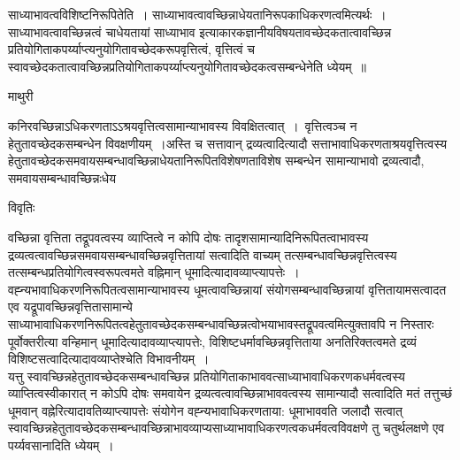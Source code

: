 \documentclass[10pt, openany]{book}
\begin{document}
{{\qt साध्याभावत्वविशिष्टनिरूपितेति~।} साध्याभावत्वावच्छिन्नाधेयतानिरूपकाधिकरणत्वमित्यर्थः~। साध्याभावत्वावच्छिन्नत्वं चाधेयतायां साध्याभाव इत्याकारकज्ञानीयविषयतावच्छेदकतात्वावच्छिन्न प्रतियोगिताकपर्य्याप्त्यनुयोगितावच्छेदकरूपवृत्तित्वं, वृत्तित्वं च स्वावच्छेदकतात्वावच्छिन्नप्रतियोगिताकपर्य्याप्त्यनुयोगितावच्छेदकत्वसम्बन्धेनेति ध्येयम्~॥
\newpage
\begin{center}  माथुरी  \end{center}
{\la कनिरवच्छिन्नाऽधिकरणताऽऽश्रयवृत्तित्वसामान्याभावस्य विवक्षितत्वात्~।~वृत्तित्वञ्च न हेतुतावच्छेदकसम्बन्धेन विवक्षणीयम्~।अस्ति च सत्तावान् द्रव्यत्वादित्यादौ सत्ताभावाधिकरणताश्रयवृत्तित्वस्य हेतुतावच्छेदकसमवायसम्बन्धावच्छिन्नाधेयतानिरूपितविशेषणताविशेष सम्बन्धेन सामान्याभावो द्रव्यत्वादौ, समवायसम्बन्धावच्छिन्नःधेय}
\begin{center}     विवृतिः \end{center}
वच्छिन्ना वृत्तिता तद्रूपवत्वस्य व्याप्तित्वे न कोपि दोषः तादृशसामान्यादिनिरूपितत्वाभावस्य द्रव्यत्वत्वावच्छिन्नसमवायसम्बन्धावच्छिन्नवृत्तितायां सत्वादिति वाच्यम् तत्सम्बन्धावच्छिन्नवृत्तित्वस्य तत्सम्बन्धप्रतियोगित्वस्वरूपत्वमते वह्निमान् धूमादित्यादावव्याप्त्यापत्तेः~। वह्न्यभावाधिकरणनिरूपितत्वसामान्याभावस्य धूमत्वावच्छिन्नायां संयोगसम्बन्धावच्छिन्नायां वृत्तितायामसत्वादत एव यद्रूपावच्छिन्नवृत्तितासामान्ये
साध्याभावाधिकरणनिरूपितत्वहेतुतावच्छेदकसम्बन्धावच्छिन्नत्वोभयाभावस्तद्रूपवत्वमित्युक्तावपि न निस्तारः पूर्वोक्तरीत्या
वन्हिमान् धूमादित्यादावव्याप्त्यापत्तेः, विशिष्टधर्मावच्छिन्नवृत्तिताया अनतिरिक्तत्वमते द्रव्यं विशिष्टसत्वादित्यादावव्याप्तेश्चेति विभावनीयम्~।\\

यत्तु स्वावच्छिन्नहेतुतावच्छेदकसम्बन्धावच्छिन्न प्रतियोगिताकाभाववत्साध्याभावाधिकरणकधर्मवत्वस्य व्याप्तित्वस्वीकारात् न कोऽपि दोषः समवायेन द्रव्यत्वत्वावच्छिन्नाभाववत्वस्य सामान्यादौ सत्वादिति मतं तत्तुच्छं धूमवान् वह्नेरित्यादावतिव्याप्त्यापत्तेः संयोगेन वह्न्यभावाधिकरणताया: धूमाभाववति जलादौ सत्वात्
स्वावच्छिन्नहेतुतावच्छेदकसम्बन्धावच्छिन्नाभावव्याप्यसाध्याभावाधिकरणत्वकधर्मवत्वविवक्षणे तु चतुर्थलक्षणे एव पर्य्यवसानादिति ध्येयम्~।\\

}
\end{document}
